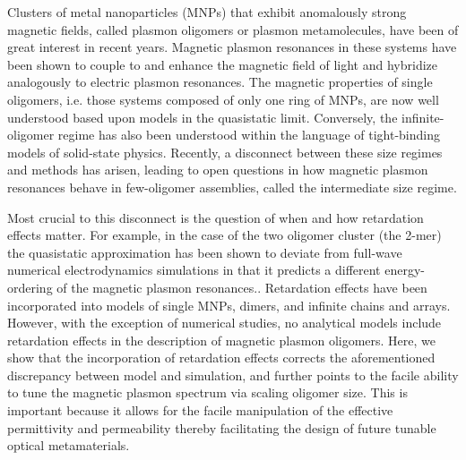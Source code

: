 \documentclass[journal=apchd5,manuscript=article]{achemso}
\begin{document}
Clusters of metal nanoparticles (MNPs) that exhibit anomalously strong magnetic fields, called plasmon oligomers or plasmon metamolecules, have been of great interest in recent years\cite{Alu2006,Alu2008,Liu2011,Dionne2011,Qian2015,Dionne2016}. Magnetic plasmon resonances in these systems have been shown to couple to and enhance the magnetic field of light and hybridize analogously to electric plasmon resonances\cite{Zhang2006,Zhang2007,NordHal2011,NordHal2012,Cherqui2014,Cherqui2016,Engheta2017}. The magnetic properties of single oligomers, i.e. those systems composed of only one ring of MNPs, are now well understood based upon models in the quasistatic limit\cite{Nord2006,Dionne2011,Dionne2016,Capolino2017}. Conversely, the infinite-oligomer regime has also been understood within the language of tight-binding models of solid-state physics\cite{Schatz2003,Weick2013}. Recently, a disconnect between these size regimes and methods has arisen, leading to open questions in how magnetic plasmon resonances behave in few-oligomer assemblies, called the intermediate size regime\cite{NordHal2011,NordHal2012,Cherqui2014,Cherqui2016,Engheta2017}.

Most crucial to this disconnect is the question of when and how retardation effects matter. For example, in the case of the two oligomer cluster (the 2-mer) the quasistatic approximation has been shown to deviate from full-wave numerical electrodynamics simulations in that it predicts a different energy-ordering of the magnetic plasmon resonances.\cite{Cherqui2014}. Retardation effects have been incorporated into models of single MNPs\cite{Gu2010}, dimers\cite{Oubre2004,vonPlessen2007}, and infinite chains and arrays\cite{Lucas1976,ARAVIND1981,Kottman2001,NordHal2003,NordProdan2004,Rechbacher2003,Schatz2003,Royer2005,Abajo2008,Gomez2009,Chumanov2010,Pinchuk2016}. However, with the exception of numerical studies, no analytical models include retardation effects in the description of magnetic plasmon oligomers. Here, we show that the incorporation of retardation effects corrects the aforementioned discrepancy between model and simulation, and further points to the facile ability to tune the magnetic plasmon spectrum via scaling oligomer size. This is important because it allows for the facile manipulation of the effective permittivity and permeability thereby facilitating the design of future tunable optical metamaterials.
\end{document}
